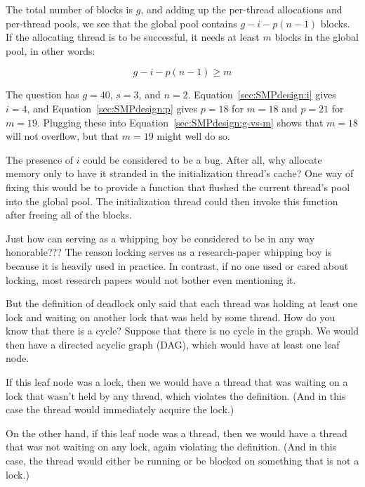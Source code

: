 \begin{enumerate}
	The total number of blocks is $g$, and adding up the per-thread
	allocations and per-thread pools, we see that the global pool
	contains $g-i-p(n-1)$ blocks.
	If the allocating thread is to be successful, it needs at least
	$m$ blocks in the global pool, in other words:

	\begin{equation}
		g - i - p(n - 1) \ge m
	\label{sec:SMPdesign:g-vs-m}
	\end{equation}

	The question has $g=40$, $s=3$, and $n=2$.
	Equation~\ref{sec:SMPdesign:i} gives $i=4$, and
	Equation~\ref{sec:SMPdesign:p} gives $p=18$ for $m=18$
	and $p=21$ for $m=19$.
	Plugging these into Equation~\ref{sec:SMPdesign:g-vs-m}
	shows that $m=18$ will not overflow, but that $m=19$ might
	well do so.

	The presence of $i$ could be considered to be a bug.
	After all, why allocate memory only to have it stranded in
	the initialization thread's cache?
	One way of fixing this would be to provide a 
	function that flushed the current thread's pool into the
	global pool.
	The initialization thread could then invoke this function
	after freeing all of the blocks.

\QuickQ{}
	Just how can serving as a whipping boy be considered to be
	in any way honorable???
\QuickA{}
	The reason locking serves as a research-paper whipping boy is
	because it is heavily used in practice.
	In contrast, if no one used or cared about locking, most research
	papers would not bother even mentioning it.

\QuickQ{}
	But the definition of deadlock only said that each thread
	was holding at least one lock and waiting on another lock
	that was held by some thread.
	How do you know that there is a cycle?
\QuickA{}
	Suppose that there is no cycle in the graph.
	We would then have a directed acyclic graph (DAG), which would
	have at least one leaf node.

	If this leaf node was a lock, then we would have a thread
	that was waiting on a lock that wasn't held by any thread,
	which violates the definition.
	(And in this case the thread would immediately acquire the
	lock.)

	On the other hand, if this leaf node was a thread, then
	we would have a thread that was not waiting on any lock,
	again violating the definition.
	(And in this case, the thread would either be running or
	be blocked on something that is not a lock.)


\end{enumerate}
